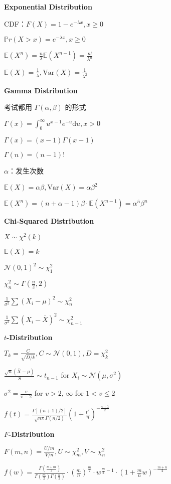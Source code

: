 \documentclass[9pt,landscape]{article}
\begin{document}
\begin{multicols}{3}
\textbf{Exponential Distribution}

CDF：$F(X)=1-e^{-\lambda x}, x\ge 0$

$\mathbb{P}r(X>x)=e^{-\lambda x}, x\ge 0$

$\mathbb{E}(X^n)=\frac{n}{\lambda}\mathbb{E}(X^{n-1})=\frac{n!}{\lambda^n}$

$\mathbb{E}(X)=\frac{1}{\lambda}, \mathrm{Var}(X)=\frac{1}{\lambda^2}$

\textbf{Gamma Distribution}

考试都用 $\Gamma(\alpha, \beta)$ 的形式

$\Gamma(x)=\int_{0}^{\infty}u^{x-1}e^{-u}\mathrm{d}u, x>0$

$\Gamma(x)=(x-1)\Gamma(x - 1)$

$\Gamma(n)=(n-1)!$

$\alpha$：发生次数

$\mathbb{E}(X)=\alpha\beta, \mathrm{Var}(X)=\alpha\beta^2$

$\mathbb{E}(X^n)=(n+\alpha-1)\beta\cdot\mathbb{E}(X^{n-1})=\alpha^{\overline{n}}\beta^n$

\textbf{Chi-Squared Distribution}

$X\sim \chi^2(k)$

$\mathbb{E}(X)=k$

$\mathcal{N}(0, 1)^2\sim \chi^2_1$

$\chi^2_n\sim \Gamma\left(\frac{n}{2}, 2\right)$

$\frac{1}{\sigma^2}\sum (X_i-\mu)^2\sim\chi^2_n$

$\frac{1}{\sigma^2}\sum (X_i-\overline{X})^2\sim\chi^2_{n-1}$

\textbf{$t$-Distribution}

$T_k = \frac{C}{\sqrt{D/k}}, C\sim\mathcal{N}(0, 1), D = \chi^2_k$

$\frac{\sqrt{n}(\overline{X}-\mu)}{S}\sim t_{n-1}$ for $X_i\sim \mathcal{N}(\mu, \sigma^2)$

$\sigma^2=\frac{v}{v-2}$ for $v>2$, $\infty$ for $1<v\le 2$

$f(t)=\frac{\Gamma[(n + 1) / 2]}{\sqrt{n\pi}\Gamma(n/2)}\left(1 + \frac{t^2}{n}\right)^{-\frac{n + 1}{2}}$

\textbf{$F$-Distribution}

$F(m, n) = \frac{U/m}{V/n}, U\sim\chi_m^2, V\sim \chi_n^2$

$f(w)=\frac{\Gamma\left(\frac{n+m}{2}\right)}{\Gamma\left(\frac{m}{2}\right)\Gamma\left(\frac{n}{2}\right)}\cdot\left(\frac{m}{n}\right)^{\frac{m}{2}}\cdot w^{\frac{m}{2}-1}\cdot\left(1+\frac{m}{n}w\right)^{-\frac{m+n}{2}}$


\end{multicols}
\end{document}
